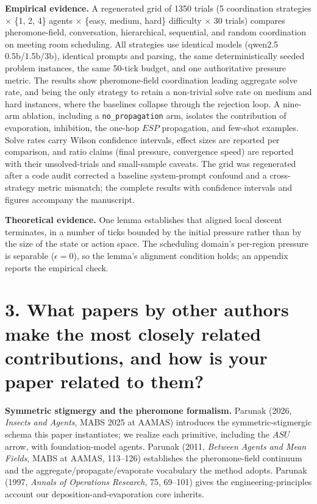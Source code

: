 \documentclass[11pt]{article}
\begin{document}
\textbf{Empirical evidence.} A regenerated grid of 1350 trials (5 coordination strategies $\times$ \{1, 2, 4\} agents $\times$ \{easy, medium, hard\} difficulty $\times$ 30 trials) compares pheromone-field, conversation, hierarchical, sequential, and random coordination on meeting room scheduling. All strategies use identical models (qwen2.5 0.5b/1.5b/3b), identical prompts and parsing, the same deterministically seeded problem instances, the same 50-tick budget, and one authoritative pressure metric. The results show pheromone-field coordination leading aggregate solve rate, and being the only strategy to retain a non-trivial solve rate on medium and hard instances, where the baselines collapse through the rejection loop. A nine-arm ablation, including a \texttt{no\_propagation} arm, isolates the contribution of evaporation, inhibition, the one-hop $ESP$ propagation, and few-shot examples. Solve rates carry Wilson confidence intervals, effect sizes are reported per comparison, and ratio claims (final pressure, convergence speed) are reported with their unsolved-trials and small-sample caveats. The grid was regenerated after a code audit corrected a baseline system-prompt confound and a cross-strategy metric mismatch; the complete results with confidence intervals and figures accompany the manuscript.

\textbf{Theoretical evidence.} One lemma establishes that aligned local descent terminates, in a number of ticks bounded by the initial pressure rather than by the size of the state or action space. The scheduling domain's per-region pressure is separable ($\epsilon = 0$), so the lemma's alignment condition holds; an appendix reports the empirical check.

\section*{3. What papers by other authors make the most closely related contributions, and how is your paper related to them?}

\textbf{Symmetric stigmergy and the pheromone formalism.} Parunak (2026, \emph{Insects and Agents}, MABS 2025 at AAMAS) introduces the symmetric-stigmergic schema this paper instantiates; we realize each primitive, including the $ASU$ arrow, with foundation-model agents. Parunak (2011, \emph{Between Agents and Mean Fields}, MABS at AAMAS, 113--126) establishes the pheromone-field continuum and the aggregate/propagate/evaporate vocabulary the method adopts. Parunak (1997, \emph{Annals of Operations Research}, 75, 69--101) gives the engineering-principles account our deposition-and-evaporation core inherits.
\end{document}

